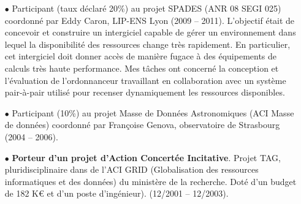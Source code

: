 \begin{itemize}
\item[$\bullet$]
Participant (taux déclaré 20\%) au projet SPADES (ANR 08 SEGI 025) coordonné par Eddy Caron, 
LIP-ENS Lyon (2009 -- 2011). L'objectif était de concevoir et construire un intergiciel capable 
de gérer un environnement dans lequel la disponibilité des ressources change très rapidement. 
En particulier, cet intergiciel doit donner accès de manière fugace à des équipements de calculs 
très haute performance. Mes tâches ont concerné la conception et l'évaluation de l'ordonnanceur
travaillant en collaboration avec un système pair-à-pair utilisé pour recenser dynamiquement
les ressources disponibles.\\


\item[$\bullet$] Participant (10\%) au projet Masse de Données Astronomiques (ACI Masse de données) 
coordonné par Françoise Genova, observatoire de Strasbourg (2004 -- 2006). \\

\item[$\bullet$]
\textbf{Porteur d'un projet d'Action Concertée Incitative}. Projet TAG, 
pluridisciplinaire dans de l'ACI GRID (Globalisation des ressources informatiques et des données) 
du ministère de la recherche. Doté d'un budget de 182 K\euro{} et d'un poste d'ingénieur). 
(12/2001 -- 12/2003).\\

\end{itemize}

